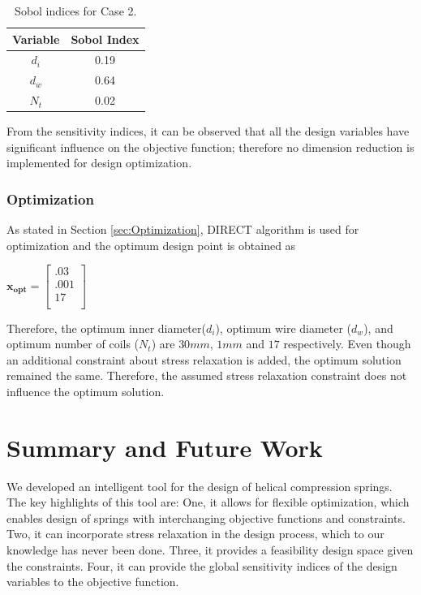 \documentclass[10pt]{article}
\begin{document}
	\begin{table}[H]
	\caption{Sobol indices for Case 2.}
	\centering
		 \begin{tabular}{ c c}
			 \hline \hline
	 		Variable & Sobol Index\\
			\hline
	 		 $d_{i}$ & 0.19 \\
			 $d_{w}$ & 0.64  \\
			 $N_{t}$ & 0.02 \\ 
			\hline \hline
		 \end{tabular}
	\end{table}


From the sensitivity indices, it can be observed that all the design variables have significant influence on the objective function; therefore no dimension reduction is implemented for design optimization. 


\subsubsection{Optimization}
	
	As stated in Section \ref{sec:Optimization}, DIRECT algorithm is used for optimization and the optimum design point is obtained as 
	\begin{center}
	$\mathbf{x_{opt}} =
	\left[
	\begin{array}{c}
	 	 .03 \\
	 	 .001 \\
		 17    \\ 
		
	 \end{array}
	 \right]
$	
\end{center}
    Therefore, the optimum inner diameter($d_{i}$), optimum wire diameter ($d_{w}$), and optimum number of coils ($N_{t}$) are $30 mm$, $1 mm$ and $17$ respectively. Even though an additional constraint about stress relaxation is added, the optimum solution remained the same. Therefore, the assumed stress relaxation constraint does not influence the optimum solution.
    
\section{Summary and Future Work}
\label{sec:Summary}

We developed an intelligent tool for the design of helical compression springs. The key highlights of this tool are: One, it allows for flexible optimization, which enables design of springs with interchanging objective functions and constraints. Two, it can incorporate stress relaxation in the design process, which to our knowledge has never been done. Three, it provides a feasibility design space given the constraints. Four, it can provide the global sensitivity indices of the design variables to the objective function. 
\end{document}
